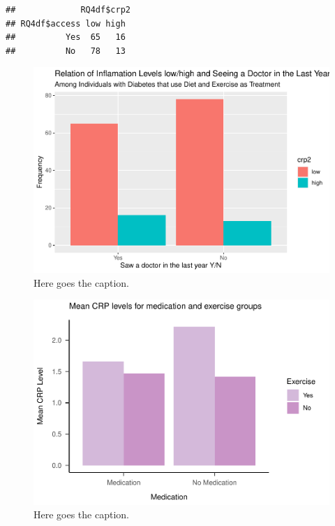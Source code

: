\documentclass[
  man]{apa6}
\begin{document}
\begin{verbatim}
##             RQ4df$crp2
## RQ4df$access low high
##          Yes  65   16
##          No   78   13
\end{verbatim}

\begin{figure}[H]
\includegraphics{NEW_Final_Groupof5_files/figure-latex/prop-access-bar-1} \caption{Here goes the caption.}\label{fig:prop-access-bar}
\end{figure}



\begin{figure}[H]
\includegraphics{NEW_Final_Groupof5_files/figure-latex/tableofcrpmedicationandexercise-1} \caption{Here goes the caption.}\label{fig:tableofcrpmedicationandexercise}
\end{figure}
\end{document}
